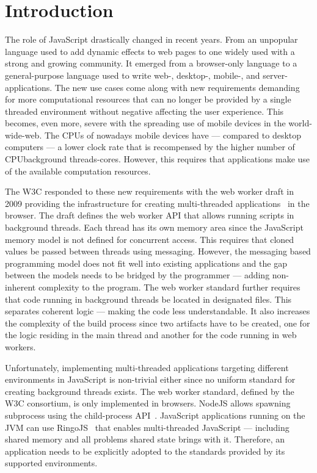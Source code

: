\section{Introduction}\label{sec:introduction}
The role of JavaScript drastically changed in recent years. From an unpopular language used to add dynamic effects to web pages to one widely used with a strong and growing community. It emerged from a browser-only language to a general-purpose language used to write web-, desktop-, mobile-, and server-applications. The new use cases come along with new requirements demanding for more computational resources that can no longer be provided by a single threaded environment without negative affecting the user experience. This becomes, even more, severe with the spreading use of mobile devices in the world-wide-web. The CPUs of nowadays mobile devices have  --- compared to desktop computers --- a lower clock rate that is recompensed by the higher number of CPUbackground threads-cores. However, this requires that applications make use of the available computation resources. 

The W3C responded to these new requirements with the web worker draft in 2009 providing the infrastructure for creating multi-threaded applications~\cite{w3cWebWorker} in the browser. The draft defines the web worker API that allows running scripts in background threads. Each thread has its own memory area since the JavaScript memory model is not defined for concurrent access. This requires that cloned values be passed between threads using messaging. However, the messaging based programming model does not fit well into existing applications and the gap between the models needs to be bridged by the programmer --- adding non-inherent complexity to the program. The web worker standard further requires that code running in background threads be located in designated files. This separates coherent logic --- making the code less understandable. It also increases the complexity of the build process since two artifacts have to be created, one for the logic residing in the main thread and another for the code running in web workers. 

Unfortunately, implementing multi-threaded applications targeting different environments in JavaScript is non-trivial either since no uniform standard for creating background threads exists. The web worker standard, defined by the W3C consortium, is only implemented in browsers. NodeJS allows spawning subprocess using the child-process API~\cite{childProcess}. JavaScript applications running on the JVM can use RingoJS~\cite{RingoJS} that enables multi-threaded JavaScript --- including shared memory and all problems shared state brings with it. Therefore, an application needs to be explicitly adopted to the standards provided by its supported environments.

